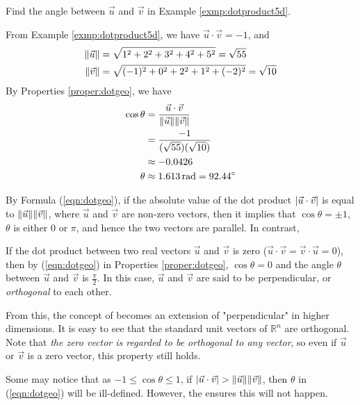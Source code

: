 \begin{exmp}
Find the angle between $\vec{u}$ and $\vec{v}$ in Example \ref{exmp:dotproduct5d}.
\end{exmp}
\begin{solution}
From Example \ref{exmp:dotproduct5d}, we have $\vec{u} \cdot \vec{v} = -1$, and
\begin{align*}
\norm{\vec{u}} &= \sqrt{1^2 + 2^2 + 3^2 + 4^2 + 5^2} = \sqrt{55} \\
\norm{\vec{v}} &= \sqrt{(-1)^2 + 0^2 + 2^2 + 1^2 + (-2)^2} = \sqrt{10} 
\end{align*}
By Properties \ref{proper:dotgeo}, we have
\begin{align*}
\cos\theta &= \frac{\vec{u} \cdot \vec{v}}{\norm{\vec{u}}\norm{\vec{v}}} \\
&= \frac{-1}{(\sqrt{55})(\sqrt{10})} \\
&\approx -0.0426 \\
\theta &\approx \SI{1.613}{\radian} = \SI{92.44}{\degree}
\end{align*}
\end{solution}
By Formula (\ref{eqn:dotgeo}), if the absolute value of the dot product $\abs{\vec{u} \cdot \vec{v}}$ is equal to $\norm{\vec{u}}\norm{\vec{v}}$, where $\vec{u}$ and $\vec{v}$ are non-zero vectors, then it implies that $\cos\theta = \pm 1$, $\theta$ is either $0$ or $\pi$, and hence the two vectors are parallel. In contrast,
\begin{proper}
\label{proper:dotorth}
If the dot product between two real vectors $\vec{u}$ and $\vec{v}$ is zero ($\vec{u} \cdot \vec{v} = \vec{v} \cdot \vec{u} = 0$), then by (\ref{eqn:dotgeo}) in Properties \ref{proper:dotgeo}, $\cos\theta = 0$ and the angle $\theta$ between $\vec{u}$ and $\vec{v}$ is $\frac{\pi}{2}$. In this case, $\vec{u}$ and $\vec{v}$ are said to be perpendicular, or \textit{orthogonal} to each other.
\end{proper}
From this, the concept of  becomes an extension of "perpendicular" in higher dimensions. It is easy to see that the standard unit vectors of $\mathbb{R}^n$ are orthogonal. Note that \textit{the zero vector is regarded to be orthogonal to any vector}, so even if $\vec{u}$ or $\vec{v}$ is a zero vector, this property still holds. \par
Some may notice that as $-1 \leq \cos\theta \leq 1$, if $\abs{\vec{u} \cdot \vec{v}} > \norm{\vec{u}}\norm{\vec{v}}$, then $\theta$ in (\ref{eqn:dotgeo}) will be ill-defined. However, the  ensures this will not happen.
